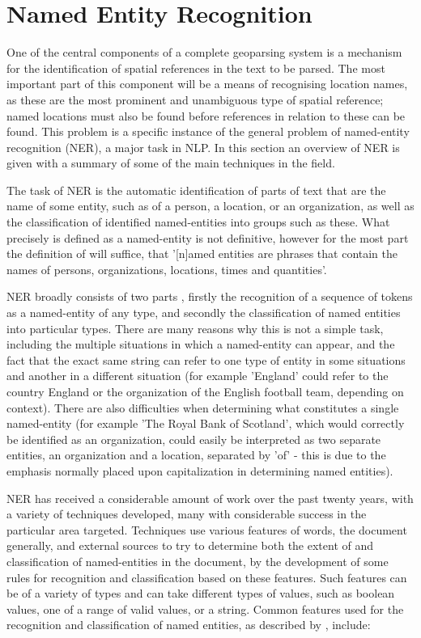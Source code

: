 \documentclass[12pt, a4paper]{report}
\begin{document}
\section{Named Entity Recognition}
\label{sec_ner}

One of the central components of a complete geoparsing system is a mechanism for the identification of spatial references in the text to be parsed. The most important part of this component will be a means of recognising location names, as these are the most prominent and unambiguous type of spatial reference; named locations must also be found before references in relation to these can be found. This problem is a specific instance of the general problem of named-entity recognition (NER), a major task in NLP. In this section an overview of NER is given with a summary of some of the main techniques in the field.

The task of NER is the automatic identification of parts of text that are the name of some entity, such as of a person, a location, or an organization, as well as the classification of identified named-entities into groups such as these. What precisely is defined as a named-entity is not definitive, however for the most part the definition of \citet{conll2002} will suffice, that '[n]amed entities are phrases that contain the names of persons, organizations, locations, times and quantities'. %

NER broadly consists of two parts \citep{nadeau2009}, firstly the recognition of a sequence of tokens as a named-entity of any type, and secondly the classification of named entities into particular types. There are many reasons why this is not a simple task, including the multiple situations in which a named-entity can appear, and the fact that the exact same string can refer to one type of entity in some situations and another in a different situation (for example 'England' could refer to the country England or the organization of the English football team, depending on context). There are also difficulties when determining what constitutes a single named-entity (for example 'The Royal Bank of Scotland', which would correctly be identified as an organization, could easily be interpreted as two separate entities, an organization and a location, separated by 'of' - this is due to the emphasis normally placed upon capitalization in determining named entities).

NER has received a considerable amount of work over the past twenty years, with a variety of techniques developed, many with considerable success in the particular area targeted. Techniques use various features of words, the document generally, and external sources to try to determine both the extent of and classification of named-entities in the document, by the development of some rules for recognition and classification based on these features. Such features can be of a variety of types and can take different types of values, such as boolean values, one of a range of valid values, or a string. Common features used for the recognition and classification of named entities, as described by \citet{nadeau2009}, include:
\end{document}
